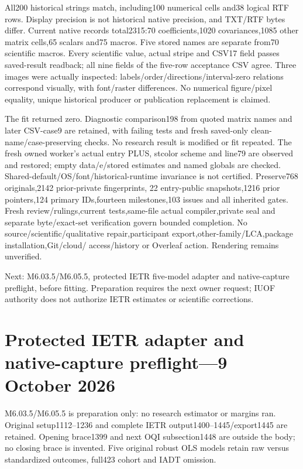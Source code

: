 \documentclass[11pt,a4paper]{article}
\begin{document}
All200 historical strings match, including100 numerical cells and38 logical
RTF rows. Display precision is not historical native precision, and TXT/RTF
bytes differ. Current native records total2315:70 coefficients,1020
covariances,1085 other matrix cells,65 scalars and75 macros. Five stored
names are separate from70 scientific macros. Every scientific value,
actual stripe and CSV17 field passes saved-result readback; all nine fields
of the five-row acceptance CSV agree. Three images were actually inspected:
labels/order/directions/interval-zero relations correspond visually, with
font/raster differences. No numerical figure/pixel equality, unique
historical producer or publication replacement is claimed.

The fit returned zero. Diagnostic comparison198 from quoted matrix names
and later CSV-case9 are retained, with failing tests and fresh saved-only
clean-name/case-preserving checks. No research result is modified or fit
repeated. The fresh owned worker's actual entry PLUS, stcolor scheme and
line79 are observed and restored; empty data/e/stored estimates and named
globals are checked. Shared-default/OS/font/historical-runtime invariance
is not certified. Preserve768 originals,2142 prior-private fingerprints,
22 entry-public snapshots,1216 prior pointers,124 primary IDs,fourteen
milestones,103 issues and all inherited gates. Fresh review/rulings,current
tests,same-file actual compiler,private seal and separate byte/exact-set
verification govern bounded completion. No source/scientific/qualitative
repair,participant export,other-family/LCA,package installation,Git/cloud/
access/history or Overleaf action. Rendering remains unverified.

Next: M6.03.5/M6.05.5, protected IETR five-model adapter and native-capture
preflight, before fitting. Preparation requires the next owner request;
IUOF authority does not authorize IETR estimates or scientific corrections.

\section*{Protected IETR adapter and native-capture preflight---9 October 2026}
M6.03.5/M6.05.5 is preparation only: no research estimator or margins ran.
Original setup1112--1236 and complete IETR output1400--1445/export1445
are retained. Opening brace1399 and next OQI subsection1448 are outside
the body; no closing brace is invented. Five original robust OLS models
retain raw versus standardized outcomes, full423 cohort and IADT omission.
\end{document}
